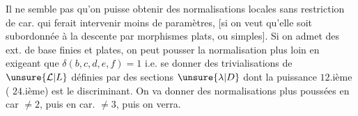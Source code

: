 
Il ne semble pas qu'on puisse obtenir des normalisations locales sans  restriction de car. qui ferait intervenir moins de paramètres, [si on veut qu'elle soit subordonnée à la descente  par morphismes plats, ou  simples]. Si on admet des ext. de base finies et plates, on peut pousser la normalisation plus loin en exigeant que $\delta(b,c,d,e,f)=1$ i.e.  se donner des trivialisations de $\unsure{\mathcal L|L}$  définies par des sections $\unsure{\lambda|D}$ dont la puissance $12$.ième ( $24$.ième) est  le discriminant. On va  donner des  normalisations plus poussées en car $\neq2$, puis en car. $\neq3$, puis on verra.
